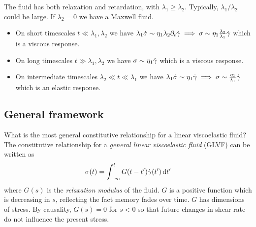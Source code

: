 \documentclass{jknotes}
\begin{document}
The fluid has both relaxation and retardation, with $\lambda_1 \ge \lambda_2$.
Typically, $\lambda_1/\lambda_2$ could be large. If $\lambda_2 = 0$ we have a
Maxwell fluid.

\begin{itemize}
	 \item On short timescales $t \ll \lambda_1, \lambda_2$ we have $\lambda_1
		 \dot{\sigma} \sim \eta_1 \lambda_2 \partial_t \dot{\gamma} \implies \sigma
		 \sim \eta_1\frac{\lambda_2}{\lambda_1} \dot{\gamma}$ which is a viscous
		 response.
	\item On long timescales $t \gg \lambda_1, \lambda_2$ we have $\sigma \sim
		\eta_1 \dot{\gamma}$ which is a viscous response.
	\item On intermediate timescales $\lambda_2 \ll t \ll \lambda_1$ we have
		$\lambda_1 \dot{\sigma} \sim \eta_1 \dot{\gamma} \implies \sigma \sim
		\frac{\eta_1}{\lambda_1} \dot{\gamma}$ which is an elastic response.
\end{itemize}

\subsection{General framework}
What is the most general constitutive relationship for a linear viscoelastic
fluid? The constitutive relationship for a \emph{general linear viscoelastic
fluid} (GLVF)  can be written as
\begin{equation}
	\sigma(t) = \int_{-\infty}^t G(t-t')\srate(t')\,\diffd t'
\end{equation}
where $G(s)$ is the \emph{relaxation modulus} of the fluid. $G$ is a positive
function which is decreasing in $s$, reflecting the fact memory fades over
time. $G$ has dimensions of stress. By causality, $G(s) = 0$ for $s<0$ so that
future changes in shear rate do not influence the present stress.
\end{document}
